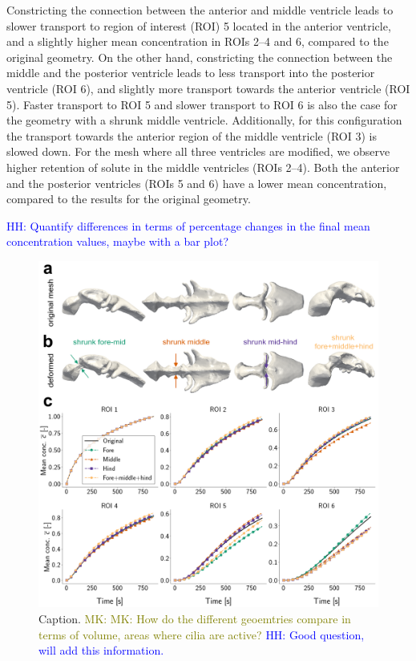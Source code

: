 \documentclass[fleqn]{wlscirep}
\newcommand{\lyng}[1]{\textcolor{blue}{#1}}
\newcommand{\mk}[1]{\textcolor{olive}{MK: #1}}
\begin{document}
Constricting the connection between the anterior and middle ventricle leads to slower transport to region of interest (ROI) 5 located in the anterior ventricle, and a slightly higher mean concentration in ROIs 2--4 and 6, compared to the original geometry. On the other hand, constricting the connection between the middle and the posterior ventricle leads to less transport into the posterior ventricle (ROI 6), and slightly more transport towards the anterior ventricle (ROI 5). Faster transport to ROI 5 and slower transport to ROI 6 is also the case for the geometry with a shrunk middle ventricle. Additionally, for this configuration the transport towards the anterior region of the middle ventricle (ROI 3) is slowed down. For the mesh where all three ventricles are modified, we observe higher retention of solute in the middle ventricles (ROIs 2--4). Both the anterior and the posterior ventricles (ROIs 5 and 6) have a lower mean concentration, compared to the results for the original geometry.

\lyng{HH: Quantify differences in terms of percentage changes in the final mean concentration values, maybe with a bar plot?}
\begin{figure}[H]
    \centering
    \includegraphics[width=\textwidth]{graphics/figure6_compare_modified_geometries.png}
    \caption{Caption. \mk{MK: How do the different geoemtries compare in terms of volume, areas where cilia are active?} \lyng{HH: Good question, will add this information.}}
    \label{fig:figure6_sim_results_compare_geometries}
\end{figure}
\end{document}
